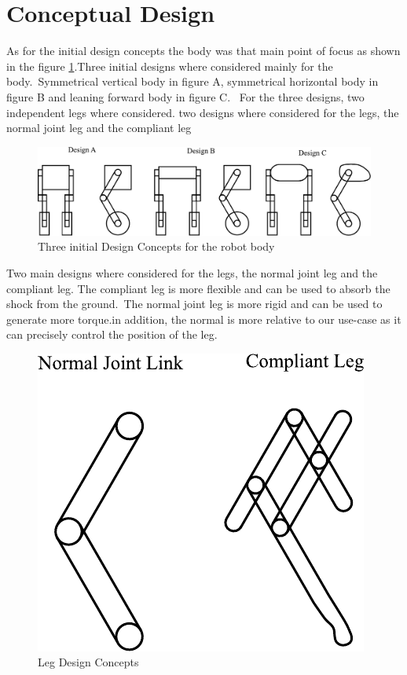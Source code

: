 \section{Conceptual Design}
As for the initial design concepts the body was that main point of focus as shown in the figure \ref{fig:initialdesigns}.Three initial designs where considered mainly for the body.\ Symmetrical vertical body in figure A, symmetrical horizontal body in figure B and leaning forward body in figure C.
\ For the three designs, two independent legs where considered.
two designs where considered for the legs, the normal joint leg and the compliant leg

\begin{figure}[h]
	\centering
	\includegraphics[width=1\linewidth]{Conceptual Design}
	\caption[Initial Design Concepts]{Three initial Design Concepts for the robot body}
	\label{fig:initialdesigns}
\end{figure}


Two main designs where considered for the legs, the normal joint leg and the compliant leg. The compliant leg is more flexible and can be used to absorb the shock from the ground.\ The normal joint leg is more rigid and can be used to generate more torque.in addition, the normal is more relative to our use-case as it can precisely control the position of the leg.


\begin{figure}[h]
	\centering
	\includegraphics[width=0.4\linewidth]{Leg Design}
	\caption[Leg Design Concepts]{Leg Design Concepts}
	\label{fig:legdesignsjbhi}
\end{figure}




